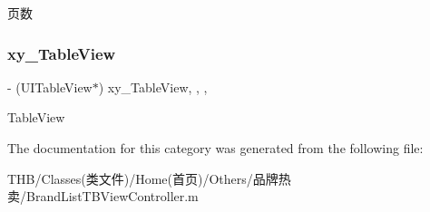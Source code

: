 页数 \mbox{\label{category_brand_list_t_b_view_controller_07_08_abef9515179ac7650354a8474d9e5e1ce}} 
\subsubsection{\texorpdfstring{xy\+\_\+\+Table\+View}{xy\_TableView}}
{\footnotesize\ttfamily -\/ (U\+I\+Table\+View$\ast$) xy\+\_\+\+Table\+View\hspace{0.3cm}{\ttfamily [read]}, {\ttfamily [write]}, {\ttfamily [nonatomic]}, {\ttfamily [strong]}}

Table\+View 

The documentation for this category was generated from the following file\+:\begin{DoxyCompactItemize}
\item 
T\+H\+B/\+Classes(类文件)/\+Home(首页)/\+Others/品牌热卖/Brand\+List\+T\+B\+View\+Controller.\+m\end{DoxyCompactItemize}

